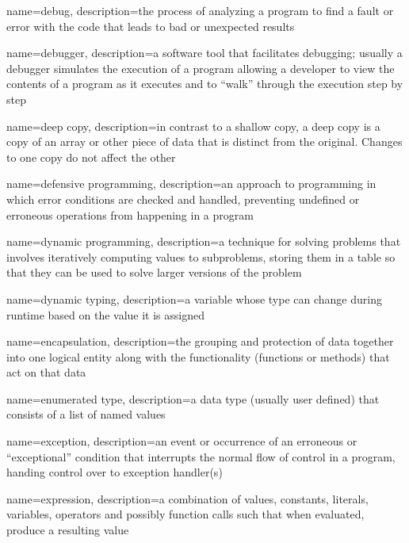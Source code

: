 {
  name=debug,
  description={the process of analyzing a program to find a fault or error with the code that leads to bad or unexpected results}
}

{
  name=debugger,
  description={a software tool that facilitates debugging; usually a debugger simulates the execution of a program allowing a developer to view the contents of a program as it executes and to ``walk'' through the execution step by step}
}

{
  name=deep copy,
  description={in contrast to a shallow copy, a deep copy is a copy of an array or other piece of data that is distinct from the original.  Changes to one copy do not affect the other}
}

{
  name=defensive programming,
  description={an approach to programming in which error conditions are checked and handled, preventing undefined or
  	erroneous operations from happening in a program}
}

{
  name=dynamic programming,
  description={a technique for solving problems that involves iteratively computing values to subproblems, storing them in a table so that they can be used to solve larger versions of the problem}
}

{
  name=dynamic typing,
  description={a variable whose type can change during runtime based on the value it is assigned}
}

{
  name=encapsulation,
  description={the grouping and protection of data together into one logical entity along with the functionality (functions or methods)
  	that act on that data}
}

{
  name=enumerated type,
  description={a data type (usually user defined) that consists of a list of named values}
}

{
  name=exception,
  description={an event or occurrence of an erroneous or ``exceptional'' condition that interrupts the normal flow of control in a program, handing control over to exception handler(s)}
}

{
  name=expression,
  description={a combination of values, constants, literals, variables, operators and possibly function calls such that when evaluated, produce a resulting value}
}


